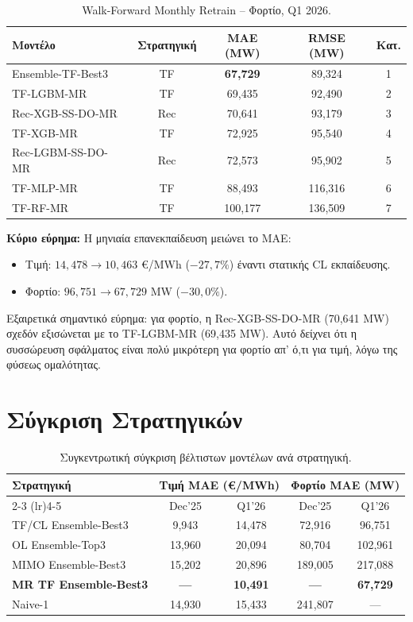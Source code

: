 \begin{table}[H]
\centering
\caption{Walk-Forward Monthly Retrain -- Φορτίο, Q1 2026.}
\label{tab:mr_load_q1}
\begin{tabular}{lcccc}
\toprule
\textbf{Μοντέλο} & \textbf{Στρατηγική} & \textbf{MAE (MW)} & \textbf{RMSE (MW)} & \textbf{Κατ.} \\
\midrule
Ensemble-TF-Best3 & TF & \textbf{67,729} & 89,324 & 1 \\
TF-LGBM-MR & TF & 69,435 & 92,490 & 2 \\
Rec-XGB-SS-DO-MR & Rec & 70,641 & 93,179 & 3 \\
TF-XGB-MR & TF & 72,925 & 95,540 & 4 \\
Rec-LGBM-SS-DO-MR & Rec & 72,573 & 95,902 & 5 \\
TF-MLP-MR & TF & 88,493 & 116,316 & 6 \\
TF-RF-MR & TF & 100,177 & 136,509 & 7 \\
\bottomrule
\end{tabular}
\end{table}

\noindent\textbf{Κύριο εύρημα:} Η μηνιαία επανεκπαίδευση μειώνει το MAE:
\begin{itemize}
    \item Τιμή: $14,478 \rightarrow 10,463$ €/MWh ($-27,7\%$) έναντι στατικής CL εκπαίδευσης.
    \item Φορτίο: $96,751 \rightarrow 67,729$ MW ($-30,0\%$).
\end{itemize}

Εξαιρετικά σημαντικό εύρημα: για φορτίο, η Rec-XGB-SS-DO-MR (70,641 MW) σχεδόν εξισώνεται
με το TF-LGBM-MR (69,435 MW). Αυτό δείχνει ότι η συσσώρευση σφάλματος είναι πολύ μικρότερη
για φορτίο απ' ό,τι για τιμή, λόγω της φύσεως ομαλότητας.


\section{Σύγκριση Στρατηγικών}
\label{sec:strategy_comparison}

\begin{table}[H]
\centering
\caption{Συγκεντρωτική σύγκριση βέλτιστων μοντέλων ανά στρατηγική.}
\label{tab:strategy_summary}
\begin{tabular}{lcccc}
\toprule
\textbf{Στρατηγική} & \multicolumn{2}{c}{\textbf{Τιμή MAE (€/MWh)}} & \multicolumn{2}{c}{\textbf{Φορτίο MAE (MW)}} \\
\cmidrule(lr){2-3} \cmidrule(lr){4-5}
& Dec'25 & Q1'26 & Dec'25 & Q1'26 \\
\midrule
TF/CL Ensemble-Best3 & 9,943 & 14,478 & 72,916 & 96,751 \\
OL Ensemble-Top3 & 13,960 & 20,094 & 80,704 & 102,961 \\
MIMO Ensemble-Best3 & 15,202 & 20,896 & 189,005 & 217,088 \\
\textbf{MR TF Ensemble-Best3} & \textbf{---} & \textbf{10,491} & \textbf{---} & \textbf{67,729} \\
Naive-1 & 14,930 & 15,433 & 241,807 & --- \\
\bottomrule
\end{tabular}
\end{table}

